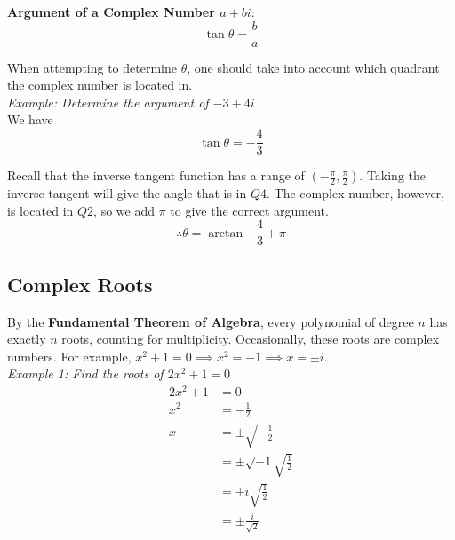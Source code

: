 \documentclass{article}
\begin{document}
            \noindent \textbf{Argument of a Complex Number $a+bi$}: \\
            \begin{equation*}
                \tan\theta=\frac{b}{a}
            \end{equation*}

            \noindent When attempting to determine $\theta$, one should take into account which
            quadrant the complex number is located in. \\
            \textit{Example: Determine the argument of $-3+4i$} \\
            We have \\

            \begin{equation*}
                \tan\theta=-\frac{4}{3}
            \end{equation*}

            \noindent Recall that the inverse tangent function has a range of $(-\frac{\pi}{2},\frac{\pi}{2})$.
            Taking the inverse tangent will give the angle that is in $Q4.$ The complex number,
            however, is located in $Q2$, so we add $\pi$ to give the correct argument. \\

            \begin{equation*}
                \therefore \theta = \arctan{-\frac{4}{3}}+\pi
            \end{equation*}


        \subsection{Complex Roots}
            By the \textbf{Fundamental Theorem of Algebra}, every polynomial of degree $n$ has exactly
            $n$ roots, counting for multiplicity. Occasionally, these roots are complex numbers.
            For example, $x^2+1=0\implies x^2=-1\implies x=\pm i$. \\

            \noindent \textit{Example 1: Find the roots of $2x^2+1=0$} \\
            \begin{align*}
                2x^2 + 1 &= 0 \\
                x^2 &= -\frac{1}{2} \\
                x &= \pm \sqrt{-\frac{1}{2}} \\
                &= \pm \sqrt{-1} \sqrt{\frac{1}{2}} \\
                &= \pm i\sqrt{\frac{1}{2}} \\
                &= \pm \frac{i}{\sqrt{2}}
            \end{align*}
\end{document}
